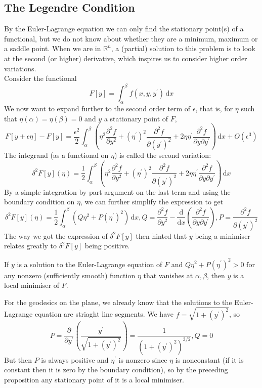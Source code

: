\documentclass[a4paper]{article}
\begin{document}
\subsection{The Legendre Condition}
By the Euler-Lagrange equation we can only find the stationary point(s) of a functional, but we do not know about whether they are a minimum, maximum or a saddle point.
When we are in $\mathbb R^n$, a (partial) solution to this problem is to look at the second (or higher) derivative, which inspires us to consider higher order variations.\\
Consider the functional
$$F[y]=\int_\alpha^\beta f(x,y,y^\prime)\,\mathrm dx$$
We now want to expand further to the second order term of $\epsilon$, that is, for $\eta$ such that $\eta(\alpha)=\eta(\beta)=0$ and $y$ a stationary point of $F$,
$$F[y+\epsilon\eta]-F[y]=\frac{\epsilon^2}{2}\int_\alpha^\beta\left( \eta^2\frac{\partial^2f}{\partial y^2}+(\eta^\prime)^2\frac{\partial^2f}{\partial(y^\prime)^2}+2\eta\eta^\prime\frac{\partial^2f}{\partial y\partial y^\prime} \right)\,\mathrm dx+O(\epsilon^3)$$
The integrand (as a functional on $\eta$) is called the second variation:
$$\delta^2 F[y](\eta)=\frac{1}{2}\int_\alpha^\beta\left( \eta^2\frac{\partial^2f}{\partial y^2}+(\eta^\prime)^2\frac{\partial^2f}{\partial(y^\prime)^2}+2\eta\eta^\prime\frac{\partial^2f}{\partial y\partial y^\prime} \right)\,\mathrm dx$$
By a simple integration by part argument on the last term and using the boundary condition on $\eta$, we can further simplify the expression to get
$$\delta^2F[y](\eta)=\frac{1}{2}\int_\alpha^\beta(Q\eta^2+P(\eta^\prime)^2)\,\mathrm dx,Q=\frac{\partial^2f}{\partial y^2}-\frac{\mathrm d}{\mathrm dx}\left( \frac{\partial^2 f}{\partial y\partial y^\prime}\right),P=\frac{\partial^2f}{\partial (y^\prime)^2}$$
The way we got the expression of $\delta^2F[y]$ then hinted that $y$ being a minimiser relates greatly to $\delta^2F[y]$ being positive.
\begin{proposition}
    If $y$ is a solution to the Euler-Lagrange equation of $F$ and $Q\eta^2+P(\eta^\prime)^2>0$ for any nonzero (sufficiently smooth) function $\eta$ that vanishes at $\alpha,\beta$, then $y$ is a local minimiser of $F$.
\end{proposition}
\begin{example}
    For the geodesics on the plane, we already know that the solutions to the Euler-Lagrange equation are striaght line segments.
    We have $f=\sqrt{1+(y^\prime)^2}$, so
    $$P=\frac{\partial}{\partial y^\prime}\left( \frac{y^\prime}{\sqrt{1+(y^\prime)^2}} \right)=\frac{1}{(1+(y^\prime)^2)^{3/2}},Q=0$$
    But then $P$ is always positive and $\eta^\prime$ is nonzero since $\eta$ is nonconstant (if it is constant then it is zero by the boundary condition), so by the preceding proposition any stationary point of it is a local minimiser.
\end{example}
\end{document}
